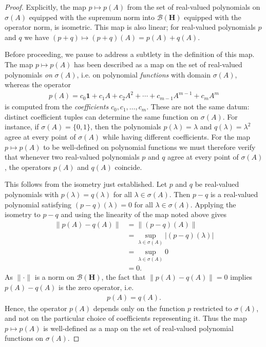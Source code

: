\begin{proof}
Explicitly, the map $p \mapsto p(A)$ from the set of real-valued polynomials on $\sigma(A)$ equipped with the supremum norm into $\mathcal{B}(\mathbf{H})$ equipped with the operator norm, is isometric. This map is also linear; for real-valued polynomials $p$ and $q$ we have $(p + q) \mapsto (p + q)(A) = p(A) + q(A)$.

Before proceeding, we pause to address a subtlety in the definition of this map. The map $p \mapsto p(A)$ has been described as a map on the set of real-valued polynomials \textit{on} $\sigma(A)$, i.e. on polynomial \textit{functions} with domain $\sigma(A)$, whereas the operator
\begin{align}
    p(A) = c_0 \mathbf{1} + c_1 A + c_2 A^2 + \cdots + c_{m - 1} A^{m - 1} + c_m A^m
\end{align}
is computed from the \textit{coefficients} $c_0, c_1, \ldots, c_m$. These are not the same datum: distinct coefficient tuples can determine the same function on $\sigma(A)$. For instance, if $\sigma(A) = \{ 0, 1 \}$, then the polynomials $p(\lambda) = \lambda$ and $q(\lambda) = \lambda^2$ agree at every point of $\sigma(A)$ while having different coefficients. For the map $p \mapsto p(A)$ to be well-defined on polynomial functions we must therefore verify that whenever two real-valued polynomials $p$ and $q$ agree at every point of $\sigma(A)$, the operators $p(A)$ and $q(A)$ coincide.

This follows from the isometry just established. Let $p$ and $q$ be real-valued polynomials with $p(\lambda) = q(\lambda)$ for all $\lambda \in \sigma(A)$. Then $p - q$ is a real-valued polynomial satisfying $(p - q)(\lambda) = 0$ for all $\lambda \in \sigma(A)$. Applying the isometry to $p - q$ and using the linearity of the map noted above gives
\begin{align}
    \left\| p(A) - q(A) \right\| &= \left\| (p - q)(A) \right\| \\
                                 &= \sup\limits_{\lambda \in \sigma(A)} \lvert (p - q)(\lambda) \rvert \\
                                 &= \sup\limits_{\lambda \in \sigma(A)} 0 \\
                                 &= 0.
\end{align}
As $\| \cdot \|$ is a norm on $\mathcal{B}(\mathbf{H})$, the fact that $\left\| p(A) - q(A) \right\| = 0$ implies $p(A) - q(A)$ is the zero operator, i.e.
\begin{align}
    p(A) = q(A).
\end{align}
Hence, the operator $p(A)$ depends only on the function $p$ restricted to $\sigma(A)$, and not on the particular choice of coefficients representing it. Thus the map $p \mapsto p(A)$ is well-defined as a map on the set of real-valued polynomial functions on $\sigma(A)$.


\end{proof}
